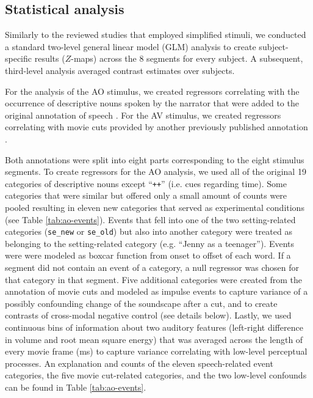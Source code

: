 \documentclass[english]{article}
\begin{document}
\subsection{Statistical analysis}

Similarly to the reviewed studies that employed simplified stimuli, we conducted
a standard two-level general linear model (GLM) analysis to create
subject-specific results ($Z$-maps) across the 8 segments for every subject. A
subsequent, third-level analysis averaged contrast estimates over subjects.


For the analysis of the AO stimulus, we created regressors correlating with the
occurrence of descriptive nouns spoken by the narrator that were added to the
original annotation of speech \citep{haeusler2020speechanno}.
For the AV stimulus, we created regressors correlating with movie cuts provided
by another previously published annotation \citep{haeusler2016cutanno}.

Both annotations were split into eight parts corresponding to the eight stimulus
segments.
To create regressors for the AO analysis, we used all of the original 19
categories of descriptive nouns except ``\texttt{++}'' (i.e. cues regarding
time).
Some categories that were similar but offered only a small amount of counts were
pooled resulting in eleven new categories that served as experimental conditions
(see Table \ref{tab:ao-events}).
Events that fell into one of the two setting-related categories
(\texttt{se\_new} or \texttt{se\_old}) but also into another category were
treated as belonging to the setting-related category (e.g. ``Jenny as a
teenager'').
Events were were modeled as boxcar function from onset to offset of each word.
If a segment did not contain an event of a category, a null regressor was chosen
for that category in that segment.
Five additional categories were created from the annotation of movie cuts and
modeled as impulse events to capture variance of a possibly confounding change
of the soundscape after a cut, and to create contrasts of cross-modal negative
control (see details below).
Lastly, we used continuous bins of information about two auditory features
(left-right difference in volume and root mean square energy) that was averaged
across the length of every movie frame (\unit[40]{ms}) to capture variance
correlating with low-level perceptual processes.
An explanation and counts of the eleven speech-related event categories, the
five movie cut-related categories, and the two low-level confounds can be found
in Table \ref{tab:ao-events}.
\end{document}
